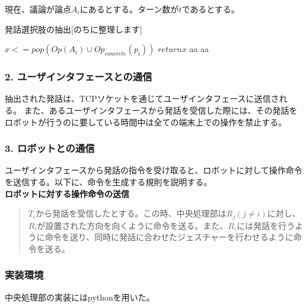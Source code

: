\documentclass[11pt, a4paper]{jreport} %
\begin{document}
現在、議論が論点$A_i$にあるとする。ターン数が$t$であるとする。
\begin{algorithm}
\caption{発話選択肢の抽出[のちに整理します]}
\begin{algorithmic}[1]
 \STATE $x <= pop(Op(A_i) \cup Op_{concrete}(p_i))$
 \STATE $return x$
 \STATE aa
 \ENDIF
\ELSE
 \STATE aa
\ENDIF

\end{algorithmic} 
\end{algorithm}





\subsubsection{2. ユーザインタフェースとの通信}
抽出された発話は、TCPソケットを通じてユーザインタフェースに送信される。
また、あるユーザインタフェースから発話を受信した際には、その発話をロボットが行うのに要している時間中は全ての端末上での操作を禁止する。


\subsubsection{3. ロボットとの通信}
ユーザインタフェースから発話の指令を受け取ると、ロボットに対して操作命令を送信する。以下に、命令を生成する規則を説明する。\\
\textbf{ロボットに対する操作命令の送信}\\
\begin{quote}
$T_i$から発話を受信したとする。この時、中央処理部は$R_j (j \neq i)$に対し、$R_i$が設置された方向を向くように命令を送る。また、$R_i$には発話を行うように命令を送り、同時に発話に合わせたジェスチャーを行わせるように命令を送る。%
\end{quote}

\subsubsection*{実装環境}
中央処理部の実装にはpythonを用いた。
\end{document}
